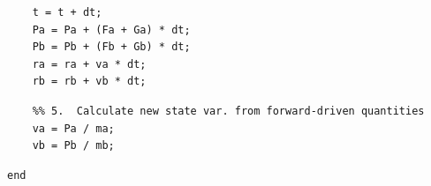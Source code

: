 \documentclass[a4paper,12pt,%
onecolumn,oneside,%
british%
]{memoir}
\renewcommand*{\|}[1][]{\nonscript\:#1\vert\nonscript\:\mathopen{}}
\begin{document}
\begin{table}[p]
\begin{framed}
\begin{verbatim}
    t = t + dt;
    Pa = Pa + (Fa + Ga) * dt;
    Pb = Pb + (Fb + Gb) * dt;
    ra = ra + va * dt;
    rb = rb + vb * dt;
\end{verbatim}
\vspace{-1.25\baselineskip}
\color{cyan}\begin{verbatim}
    %% 5.  Calculate new state var. from forward-driven quantities
    va = Pa / ma;
    vb = Pb / mb;
\end{verbatim}
\vspace{-1.25\baselineskip}
\color{midgrey}\begin{verbatim}
end
\end{verbatim}
\vspace{-1\baselineskip}\end{framed}
\end{table}


\clearpage
\color{black}
\end{document}
